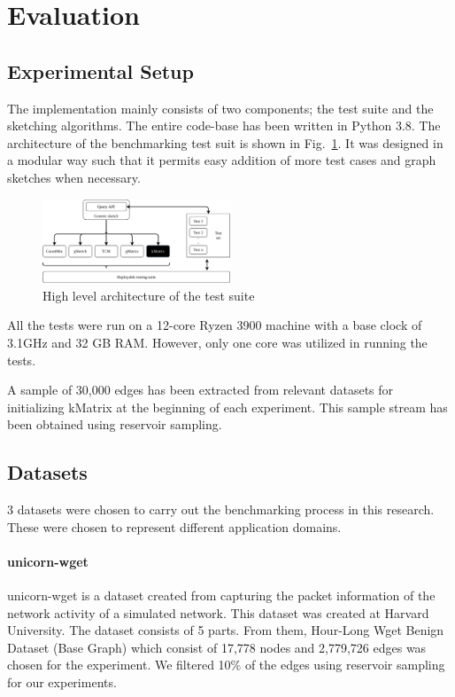 \section{Evaluation}

\subsection{Experimental Setup}

The implementation mainly consists of two components; the test suite and the sketching algorithms. The entire code-base has been written in Python 3.8. The architecture of the benchmarking test suit is shown in Fig.~\ref{fig:test_suite}. It was designed in a modular way such that it permits easy addition of more test cases and graph sketches when necessary. 

\begin{figure}[htbp]
    \centerline{\includegraphics[width=0.5\textwidth]{img/test_suite.png}}
    \caption{High level architecture of the test suite}
    \label{fig:test_suite}
\end{figure}

All the tests were run on a 12-core Ryzen 3900 machine with a base clock of 3.1GHz and 32 GB RAM. However, only one core was utilized in running the tests.

A sample of 30,000 edges has been extracted from relevant datasets for initializing kMatrix at the beginning of each experiment. This sample stream has been obtained using reservoir sampling. 

\subsection{Datasets}

3 datasets were chosen to carry out the benchmarking process in this research. These were chosen to represent different application domains. 

\paragraph{unicorn-wget\cite{DVN/5H4TDI_2018}}
unicorn-wget is a dataset created from capturing the packet information of the network activity of a simulated network. This dataset was created at Harvard University. The dataset consists of 5 parts. From them, Hour-Long Wget Benign Dataset (Base Graph) which consist of 17,778 nodes and 2,779,726 edges was chosen for the experiment. We filtered 10\% of the edges using reservoir sampling for our experiments. 

